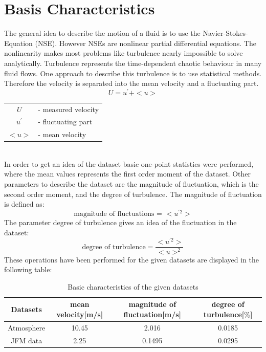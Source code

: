 \documentclass[12pt]{article}
\begin{document}
\section{Basis Characteristics}
The general idea to describe the motion of a fluid is to use the Navier-Stokes-Equation (NSE). However NSEs are nonlinear partial differential equations. The nonlinearity makes most problems like turbulence nearly impossible to solve analytically. Turbulence represents the time-dependent chaotic behaviour in many fluid flows. One approach to describe this turbulence is to use  statistical methods. Therefore the velocity is separated into the mean velocity and a fluctuating part. \cite{peinke}
\begin{equation}
U = u^{'} + <u>
\end{equation}
\begin{tabular}{c l}
$U$& - measured velocity\\
$u^{'}$& - fluctuating part\\
$<u>$ & - mean velocity \\
\end{tabular}\vspace{0.5cm}\\
In order to get an idea of the dataset basic one-point statistics were performed, where the mean values represents the first order moment of the dataset.
Other parameters to describe the dataset are the magnitude of fluctuation, which is the second order moment, and the degree of turbulence.
The magnitude of fluctuation is defined as:
\begin{equation}
\text{magnitude of fluctuations = } <u^{'2}>
\end{equation}
The parameter degree of turbulence gives an idea of the fluctuation in the dataset:
\begin{equation}
\text{degree of turbulence} = \frac{<u^{'2}>}{<u>^2}
\end{equation}
These operations have been performed for the given datasets are displayed in the following table:
\begin{table}[H]
\begin{tabular}{c c c c}
Datasets & mean velocity[m/s] & magnitude of fluctuation[m/s] & degree of turbulence[$\%$]\\
\hline
Atmosphere &10.45 &2.016& 0.0185 \\
JFM data & 2.25 &0.1495&0.0295\\
\end{tabular}
\caption{Basic characteristics of the given datasets}
\label{table:task_1}
\end{table}
\end{document}
